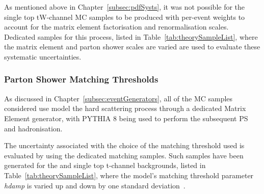 As mentioned above in Chapter~\ref{subsec:pdfSysts}, it was not possible for the single top tW-channel MC samples to be produced with per-event weights to account for the matrix element factorisation and renormalisation scales.
Dedicated samples for this process, listed in Table~\ref{tab:theorySampleList}, where the matrix element and parton shower scales are varied are used to evaluate these systematic uncertainties.

\subsubsection{Parton Shower Matching Thresholds}
As discussed in Chapter~\ref{subsec:eventGenerators}, all of the MC samples considered use model the hard scattering process through a dedicated Matrix Element generator, with PYTHIA 8 being used to perform the subsequent PS and hadronisation.

The uncertainty associated with the choice of the matching threshold used is evaluated by using the dedicated matching samples.
Such samples have been generated for the \ttbar and single top t-channel backgrounds, listed in Table~\ref{tab:theorySampleList}, where the model's matching threshold parameter \emph{hdamp} is varied up and down by one standard deviation~\cite{CMS:2016kle}.
